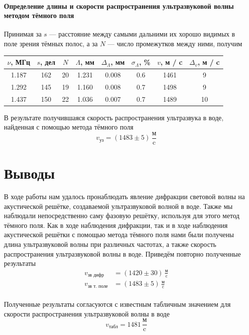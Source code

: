 \documentclass[12pt]{article}
\begin{document}
\paragraph{Определение длины и скорости распространения ультразвуковой волны методом тёмного поля} 
\par
	Принимая за $s$ --- расстояние между самыми дальними их хорошо видимых в поле зрения тёмных полос, а за $N$ --- число промежутков между ними, получим
\begin{table}[h!]
	\centering
	\begin{tabular}{|c|c|c|c|c|c|c|c|}
	\hline
		$\nu$, МГц & $s$, дел & $N$ & $\Lambda$, мм & $\Delta_\Lambda$, мм & $\sigma_\Lambda$, \% & $v$, м / c & $\Delta_v$, м / c \\
	\hline
		1.187 & 162 & 20 & 1.231 & 0.008 & 0.6 & 1461 & 9 \\
	\hline
		1.292 & 145 & 19 & 1.160 & 0.008 & 0.7 & 1498 & 9 \\
	\hline
		1.437 & 150 & 22 & 1.036 & 0.007 & 0.7 & 1489 & 10 \\
	\hline
	\end{tabular}
\end{table}
\par
	В результате получившаяся скорость распространения ультразвука в воде, найденная с помощью метода тёмного поля
\[
	v_\text{уз} = \left(1483 \pm 5 \right) \, \frac{\text{м}}{\text{c}}
\]
\section*{Выводы}
\par
	В ходе работы нам удалось пронаблюдать явление дифракции световой волны на акустической решётке, создаваемой ультразвуковой волной в воде. Также мы наблюдали непосредственно саму фазовую решётку, используя для этого метод тёмного поля. Как в ходе наблюдения дифракции, так и в ходе наблюдения акустической решётки с помощью метода тёмного поля нами были получены длина ультразвуковой волны при различных частотах, а также скорость распространения ультразвуковой волны в воде. Приведём повторно полученные результаты
\begin{align*}
	v_\text{зв дифр} &= \left(1420 \pm 30\right) \, \frac{\text{м}}{\text{c}} \\
	v_\text{зв т. поле} &= \left(1483 \pm 5\right) \, \frac{\text{м}}{\text{c}} \\
\end{align*}
\par
	Полученные результаты согласуются с известным табличным значением для скорости распространения ультразвуковой волны в воде
\[
	v_\text{табл} = 1481 \, \frac{\text{м}}{\text{c}}
\]
\end{document}
